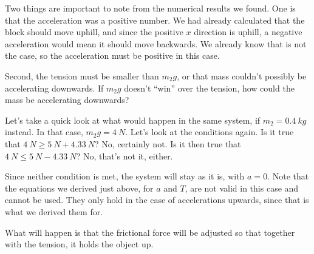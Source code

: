 Two things are important to note from the numerical results we found. One is that the acceleration was a positive number. We had already calculated that the block should move uphill, and since the positive $x$ direction is uphill, a negative acceleration would mean it should move backwards. We already know that is not the case, so the acceleration must be positive in this case.

Second, the tension must be smaller than $m_2 g$, or that mass couldn't possibly be accelerating downwards. If $m_2 g$ doesn't ``win'' over the tension, how could the mass be accelerating downwards?

Let's take a quick look at what would happen in the same system, if $m_2 = \SI{0.4}{kg}$ instead. In that case, $m_2 g = \SI{4}{N}$. Let's look at the conditions again. Is it true that $\SI{4}{N} \ge \SI{5}{N} + \SI{4.33}{N}$? No, certainly not. Is it then true that $\SI{4}{N} \le \SI{5}{N} - \SI{4.33}{N}$? No, that's not it, either.

Since neither condition is met, the system will stay as it is, with $a = 0$. Note that the equations we derived just above, for $a$ and $T$, are not valid in this case and cannot be used. They only hold in the case of accelerations upwards, since that is what we derived them for.

What will happen is that the frictional force will be adjusted so that together with the tension, it holds the object up.
